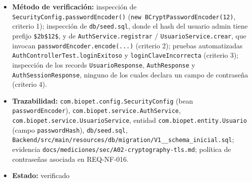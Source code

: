 \documentclass[
  spanish,
]{article}
\providecommand{\tightlist}{%
  \setlength{\itemsep}{0pt}\setlength{\parskip}{0pt}}
\begin{document}
\begin{itemize}
  \begin{enumerate}
  \def\labelenumi{\arabic{enumi}.}
  \tightlist
  \item
    El \texttt{Password\allowbreak{}Encoder} configurado es
    \texttt{BCrypt\allowbreak{}Password\allowbreak{}Encoder} con factor de coste 12.
  \item
    Toda contraseña persistida se almacena como hash BCrypt (prefijo
    \texttt{\$2b\$12\$}), incluida la del usuario administrador inicial.
  \item
    Un inicio de sesión con la contraseña correcta tiene éxito y con una
    incorrecta falla, lo que demuestra que el hash almacenado se
    verifica y no se compara texto plano.
  \item
    Ningún DTO de respuesta de la API expone la contraseña ni su hash.
  \end{enumerate}
\item
  \textbf{Método de verificación:} inspección de
  \texttt{Security\allowbreak{}Config.\allowbreak{}password\allowbreak{}Encoder()}
  (\texttt{new\ BCrypt\allowbreak{}Password\allowbreak{}Encoder(12)}, criterio 1); inspección de
  \texttt{db/\allowbreak{}seed.\allowbreak{}sql}, donde el hash del usuario admin tiene prefijo
  \texttt{\$2b\$12\$}, y de \texttt{Auth\allowbreak{}Service.\allowbreak{}registrar} /
  \texttt{Usuario\allowbreak{}Service.\allowbreak{}crear}, que invocan
  \texttt{password\allowbreak{}Encoder.\allowbreak{}encode(...)} (criterio 2); pruebas
  automatizadas \texttt{Auth\allowbreak{}Controller\allowbreak{}Test.\allowbreak{}login\allowbreak{}Exitoso} y
  \texttt{login\allowbreak{}Clave\allowbreak{}Incorrecta} (criterio 3); inspección de los records
  \texttt{Usuario\allowbreak{}Response}, \texttt{Auth\allowbreak{}Response} y
  \texttt{Auth\allowbreak{}Session\allowbreak{}Response}, ninguno de los cuales declara un campo
  de contraseña (criterio 4).
\item
  \textbf{Trazabilidad:} \texttt{com.\allowbreak{}biopet.\allowbreak{}config.\allowbreak{}Security\allowbreak{}Config} (bean
  \texttt{password\allowbreak{}Encoder}), \texttt{com.\allowbreak{}biopet.\allowbreak{}service.\allowbreak{}Auth\allowbreak{}Service},
  \texttt{com.\allowbreak{}biopet.\allowbreak{}service.\allowbreak{}Usuario\allowbreak{}Service}, entidad
  \texttt{com.\allowbreak{}biopet.\allowbreak{}entity.\allowbreak{}Usuario} (campo \texttt{password\allowbreak{}Hash}),
  \texttt{db/\allowbreak{}seed.\allowbreak{}sql},
  \texttt{Backend/\allowbreak{}src/\allowbreak{}main/\allowbreak{}resources/\allowbreak{}db/\allowbreak{}migration/\allowbreak{}V1\_\allowbreak{}\_\allowbreak{}schema\_\allowbreak{}inicial.\allowbreak{}sql};
  evidencia \texttt{docs/\allowbreak{}mediciones/\allowbreak{}sec/\allowbreak{}A02-\allowbreak{}cryptography-\allowbreak{}tls.\allowbreak{}md};
  política de contraseñas asociada en REQ-NF-016.
\item
  \textbf{Estado:} verificado
\end{itemize}
\end{document}
